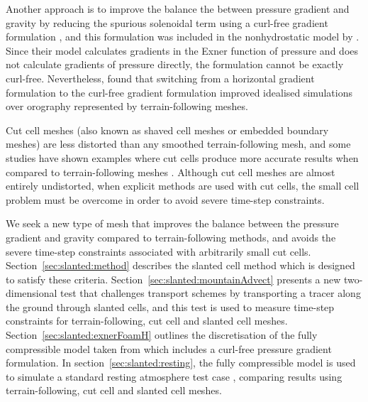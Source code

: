 Another approach is to improve the balance the between pressure gradient and gravity by reducing the spurious solenoidal term using a curl-free gradient formulation \citep{thuburn-cotter2012}, and this formulation was included in the nonhydrostatic model by \citet{weller-shahrokhi2014}.
Since their model calculates gradients in the Exner function of pressure and does not calculate gradients of pressure directly, the formulation cannot be exactly curl-free.
Nevertheless, \citet{weller-shahrokhi2014} found that switching from a horizontal gradient formulation to the curl-free gradient formulation improved idealised simulations over orography represented by terrain-following meshes.

Cut cell meshes (also known as shaved cell meshes or embedded boundary meshes) are less distorted than any smoothed terrain-following mesh, and some studies have shown examples where cut cells produce more accurate results when compared to terrain-following meshes \citep{good2014,steppeler2013}.
Although cut cell meshes are almost entirely undistorted, when explicit methods are used with cut cells, the small cell problem must be overcome in order to avoid severe time-step constraints.

We seek a new type of mesh that improves the balance between the pressure gradient and gravity compared to terrain-following methods, and avoids the severe time-step constraints associated with arbitrarily small cut cells.  Section~\ref{sec:slanted:method} describes the slanted cell method which is designed to satisfy these criteria.
Section~\ref{sec:slanted:mountainAdvect} presents a new two-dimensional test that challenges transport schemes by transporting a tracer along the ground through slanted cells, and this test is used to measure time-step constraints for terrain-following, cut cell and slanted cell meshes.
Section~\ref{sec:slanted:exnerFoamH} outlines the discretisation of the fully compressible model taken from \citet{weller-shahrokhi2014} which includes a curl-free pressure gradient formulation.
In section~\ref{sec:slanted:resting}, the fully compressible model is used to simulate a standard resting atmosphere test case \citep{klemp2011}, comparing results using terrain-following, cut cell and slanted cell meshes.





